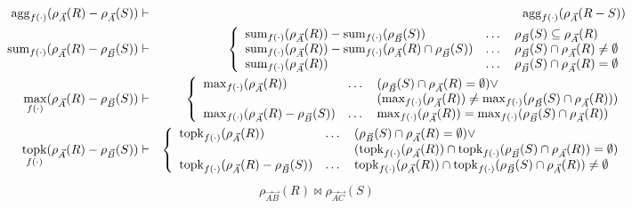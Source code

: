 \begin{figure*}
\begin{eqnarray}
\mathrm{agg}_{f(\cdot)}(\rho_{\vec{A}}(R) - \rho_{\vec{A}}(S))
& \vdash & 
\mathrm{agg}_{f(\cdot)}(\rho_{\vec{A}}(R - S))
\label{r19}\\
\mathrm{sum}_{f(\cdot)}(\rho_{\vec{A}}(R) - \rho_{\vec{B}}(S))
& \vdash &
\left\{\begin{array}{lll}
\mathrm{sum}_{f(\cdot)}(\rho_{\vec{A}}(R)) -
\mathrm{sum}_{f(\cdot)}(\rho_{\vec{B}}(S))
& \dots & \rho_{\vec{B}}(S) \subseteq \rho_{\vec{A}}(R)\\
\mathrm{sum}_{f(\cdot)}(\rho_{\vec{A}}(R)) -
\mathrm{sum}_{f(\cdot)}(\rho_{\vec{A}}(R) \cap
\rho_{\vec{B}}(S)) & \dots &
\rho_{\vec{B}}(S) \cap \rho_{\vec{A}}(R) \neq \emptyset\\
\mathrm{sum}_{f(\cdot)}(\rho_{\vec{A}}(R)) & \dots
& \rho_{\vec{B}}(S) \cap \rho_{\vec{A}}(R) = \emptyset \end{array}\right.
\label{r20}
\\
\max_{f(\cdot)}(\rho_{\vec{A}}(R) - \rho_{\vec{B}}(S))
& \vdash &
\left\{\begin{array}{lll}
\max_{f(\cdot)}(\rho_{\vec{A}}(R)) & \dots &
(\rho_{\vec{B}}(S) \cap \rho_{\vec{A}}(R) = \emptyset) \vee \\
& &  (\max_{f(\cdot)}(\rho_{\vec{A}}(R)) \neq
\max_{f(\cdot)}(\rho_{\vec{B}}(S) \cap \rho_{\vec{A}}(R))) \\
\max_{f(\cdot)}(\rho_{\vec{A}}(R)
- \rho_{\vec{B}}(S)) & \dots &  \max_{f(\cdot)}(\rho_{\vec{A}}(R)) =
\max_{f(\cdot)}(\rho_{\vec{B}}(S) \cap \rho_{\vec{A}}(R)) \\
\end{array}\right.
\label{r21}
\\
\mathop{\mathrm{topk}}_{f(\cdot)}(\rho_{\vec{A}}(R) - \rho_{\vec{B}}(S))
& \vdash &
\left\{\begin{array}{lll}
\mathrm{topk}_{f(\cdot)}(\rho_{\vec{A}}(R)) &
\dots & (\rho_{\vec{B}}(S) \cap \rho_{\vec{A}}(R) = \emptyset) \vee\\
& & (\mathrm{topk}_{f(\cdot)}(\rho_{\vec{A}}(R)) \cap 
\mathrm{topk}_{f(\cdot)}(\rho_{\vec{B}}(S) \cap \rho_{\vec{A}}(R)) = \emptyset)\\
\mathrm{topk}_{f(\cdot)}(\rho_{\vec{A}}(R) - \rho_{\vec{B}}(S))
& \dots &
\mathrm{topk}_{f(\cdot)}(\rho_{\vec{A}}(R)) \cap
\mathrm{topk}_{f(\cdot)}(\rho_{\vec{B}}(S) \cap \rho_{\vec{A}}(R)) \neq \emptyset
\end{array}\right.
\label{r22}
\end{eqnarray}
\begin{eqnarray}
\rho_{\vec{A}\vec{B}}(R) \bowtie \rho_{\vec{A}\vec{C}}(S)

\end{eqnarray}
\end{figure*}
